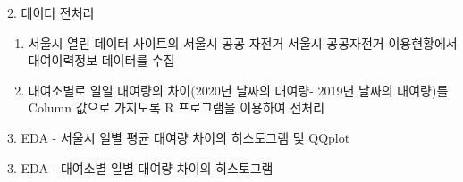 \documentclass[mathserif]{beamer}
\begin{document}
\begin{frame}{2. 데이터 전처리}
\begin{enumerate}
    \item 서울시 열린 데이터 사이트의 서울시 공공 자전거 서울시 공공자전거 이용현황에서 대여이력정보 데이터를 수집
    \item 대여소별로 일일 대여량의 차이(2020년 날짜의 대여량- 2019년 날짜의 대여량)를 Column 값으로 가지도록 R 프로그램을 이용하여 전처리
\end{enumerate}
\begin{table}[]
\end{table}
\end{frame}

\begin{frame}{3. EDA}
- 서울시 일별 평균 대여량 차이의 히스토그램 및 QQplot
\begin{figure}%
%
%
\end{figure}
\end{frame}

\begin{frame}{3. EDA}
- 대여소별 일별 대여량 차이의 히스토그램
\begin{figure}%
%
%
\end{figure}
\end{frame}
\end{document}
